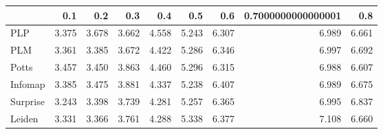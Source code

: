 \begin{tabular}{lrrrrrrrr}
\toprule
{} &   0.1 &   0.2 &   0.3 &   0.4 &   0.5 &   0.6 & 0.7000000000000001 &   0.8 \\
\midrule
PLP      & 3.375 & 3.678 & 3.662 & 4.558 & 5.243 & 6.307 &              6.989 & 6.661 \\
PLM      & 3.361 & 3.385 & 3.672 & 4.422 & 5.286 & 6.346 &              6.997 & 6.692 \\
Potts    & 3.457 & 3.450 & 3.863 & 4.460 & 5.296 & 6.315 &              6.988 & 6.607 \\
Infomap  & 3.385 & 3.475 & 3.881 & 4.337 & 5.238 & 6.407 &              6.989 & 6.675 \\
Surprise & 3.243 & 3.398 & 3.739 & 4.281 & 5.257 & 6.365 &              6.995 & 6.837 \\
Leiden   & 3.331 & 3.366 & 3.761 & 4.288 & 5.338 & 6.377 &              7.108 & 6.660 \\
\bottomrule
\end{tabular}
